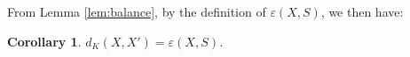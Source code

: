 \documentclass{article}
\newtheorem{corollary}[thm]{Corollary}
\DeclareMathOperator{\support}{support}
\begin{document}
From Lemma \ref{lem:balance}, by the definition of $\varepsilon(X,S)$, we then have:

\begin{corollary} \label{col:Xprime}
	$d_K(X,X') = \varepsilon(X,S)$.
\end{corollary}

%	
%	
%	
%	
%	
%	
%	
\end{document}
